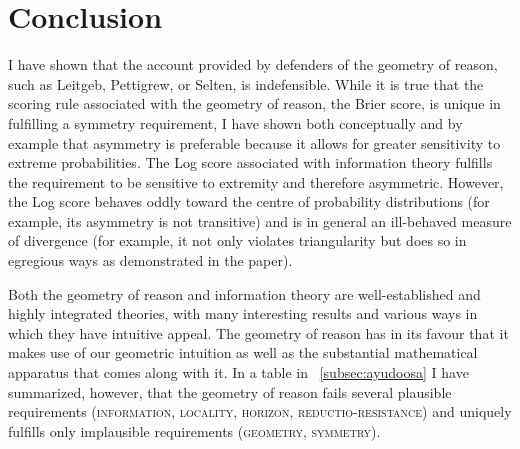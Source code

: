 \documentclass[12pt]{article}
\begin{document}
\section{Conclusion}
\label{sec:apaitahx}


I have shown that the account provided by defenders of the geometry of
reason, such as Leitgeb, Pettigrew, or Selten, is indefensible. While
it is true that the scoring rule associated with the geometry of
reason, the Brier score, is unique in fulfilling a symmetry
requirement, I have shown both conceptually and by example that
asymmetry is preferable because it allows for greater sensitivity to
extreme probabilities. The Log score associated with information
theory fulfills the requirement to be sensitive to extremity and
therefore asymmetric. However, the Log score behaves oddly toward the
centre of probability distributions (for example, its asymmetry is not
transitive) and is in general an ill-behaved measure of divergence
(for example, it not only violates triangularity but does so in
egregious ways as demonstrated in the paper).

Both the geometry of reason and information theory are
well-established and highly integrated theories, with many interesting
results and various ways in which they have intuitive appeal. The
geometry of reason has in its favour that it makes use of our
geometric intuition as well as the substantial mathematical apparatus
that comes along with it. In a table in
{\ubsection}~\ref{subsec:ayudoosa} I have summarized, however, that
the geometry of reason fails several plausible requirements
(\textsc{information}, \textsc{locality}, \textsc{horizon},
\textsc{reductio-resistance}) and uniquely fulfills only implausible
requirements (\textsc{geometry}, \textsc{symmetry}).
\end{document}
